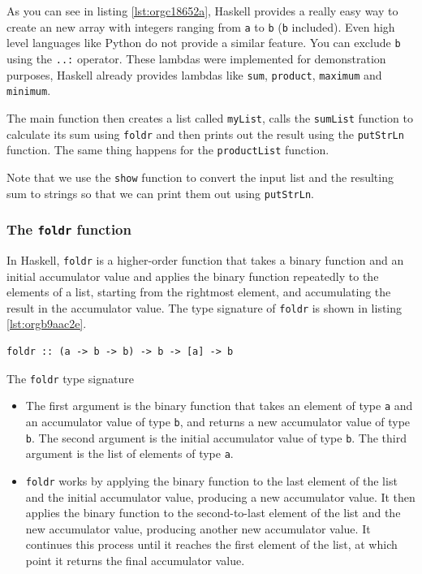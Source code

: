 \documentclass[a4paper, titlepage, twoside]{article}
\begin{document}
As you can see in listing \ref{lst:orgc18652a}, Haskell provides a really easy way to create an new array with integers ranging from \texttt{a} to \texttt{b} (\texttt{b} included). Even high level languages like Python do not provide a similar feature. You can exclude \texttt{b} using the \texttt{..:} operator. These lambdas were implemented for demonstration purposes, Haskell already provides lambdas like \texttt{sum}, \texttt{product}, \texttt{maximum} and \texttt{minimum}.

The main function then creates a list called \texttt{myList}, calls the \texttt{sumList} function to calculate its sum using \texttt{foldr} and then prints out the result using the \texttt{putStrLn} function. The same thing happens for the \texttt{productList} function.

Note that we use the \texttt{show} function to convert the input list and the resulting sum to strings so that we can print them out using \texttt{putStrLn}.

\subsubsection{The \texttt{foldr} function}
\label{sec:orgf9534d6}

In Haskell, \texttt{foldr} is a higher-order function that takes a binary function and an initial accumulator value and applies the binary function repeatedly to the elements of a list, starting from the rightmost element, and accumulating the result in the accumulator value. The type signature of \texttt{foldr} is shown in listing \ref{lst:orgb9aac2e}.

\begin{listing}[htbp]
\begin{verbatim}
foldr :: (a -> b -> b) -> b -> [a] -> b
\end{verbatim}
\caption{\label{lst:orgb9aac2e}The \texttt{foldr} type signature}
\end{listing}

\begin{itemize}
\item The first argument is the binary function that takes an element of type \texttt{a} and an accumulator value of type \texttt{b}, and returns a new accumulator value of type \texttt{b}. The second argument is the initial accumulator value of type \texttt{b}. The third argument is the list of elements of type \texttt{a}.

\item \texttt{foldr} works by applying the binary function to the last element of the list and the initial accumulator value, producing a new accumulator value. It then applies the binary function to the second-to-last element of the list and the new accumulator value, producing another new accumulator value. It continues this process until it reaches the first element of the list, at which point it returns the final accumulator value.
\end{itemize}
\end{document}
